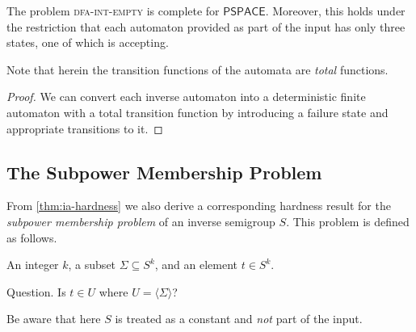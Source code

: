 \documentclass[anonymous,letter,UKenglish,cleveref,autoref,thm-restate]{lipics-v2021}
\makeatletter
\newcommand{\sse}{\subseteq}
\newcommand{\gen}[1]{\langle #1 \rangle}
\newcommand{\PSPACE}{\ensuremath{\mathsf{PSPACE}}\xspace}
\theoremstyle{plain}
\theoremstyle{plain}
\providecommand\iitem{}
\providecommand\qitem{}
\newcommand\decproblem@iitem@label{\rlap{Input.}\phantom{Question.}}
\newcommand\decproblem@qitem@label{Question.}
\newenvironment{decproblem}{\begin{description}\begin{samepage}\renewcommand{\iitem}{\item[\decproblem@iitem@label]}\renewcommand{\qitem}{\item[\decproblem@qitem@label]}}{\end{samepage}\end{description}}
\newcommand{\prob}[1]{\textup{\textsc{#1}}\xspace}
\newcommand{\dIEmpty}[1]{\prob{{#1}-int-empty}}
\makeatother
\begin{document}
\begin{corollary}
  The problem \dIEmpty{dfa} is complete for \PSPACE{}.
  Moreover, this holds under the restriction that each automaton provided as part of the input has only three states, one of which is accepting.
\end{corollary}

Note that herein the transition functions of the automata are \emph{total} functions.
\begin{proof}
  We can convert each inverse automaton into a deterministic finite automaton with a total transition function by introducing a failure state and appropriate transitions to it.
\end{proof}


\subsection{The Subpower Membership Problem}\label{sub:subpower}

From \cref{thm:ia-hardness} we also derive a corresponding hardness result for the \emph{subpower membership problem} of an inverse semigroup $S$.
This problem is defined as follows.

\begin{decproblem}
	\iitem An integer $k$, a subset $\Sigma \sse S^k$, and an element $t \in S^k$.
	\qitem Is $t \in U$ where $U = \gen{\Sigma}$?
\end{decproblem}

Be aware that here $S$ is treated as a constant and \emph{not} part of the input.
\end{document}
